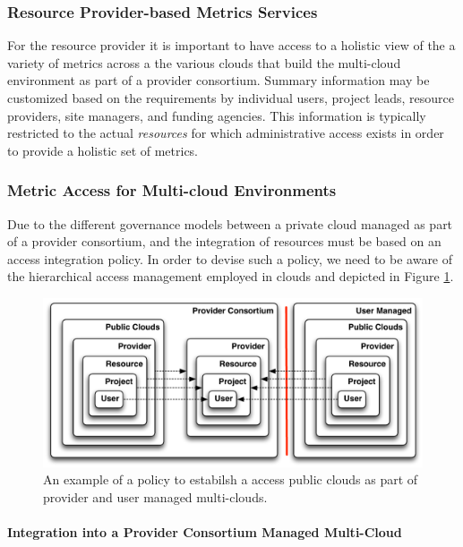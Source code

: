 \documentclass{tex/sig-alternate-2013}
\newcommand{\todo}[1]{{\color{red}{#1}}}
\begin{document}
{\subsubsection{Resource Provider-based Metrics Services} \label{S:resource-metric}

\todo{READ}

For the resource provider it is important to have access to a holistic view of the a variety of metrics across a the various clouds that build the multi-cloud environment as part of a provider consortium.  Summary information may be customized based on the requirements by individual users, project leads, resource providers, site managers, and funding agencies. This information is typically restricted to the actual {\em resources} for which administrative access exists in order to provide a holistic set of metrics.


\subsubsection{Metric Access for Multi-cloud Environments} 

\todo{READ}

Due to the different governance models between a private cloud managed as part of a provider consortium, and the integration of resources must be based on an access integration policy. In order to devise such a policy, we need to be aware of the hierarchical access management employed in clouds and depicted in Figure \ref{F:metric-hierarchy}.

\begin{figure}[htb]
  \centering
    \includegraphics[width=1.0\columnwidth]{images/metric-hierarchy.pdf}
  \caption{An example of a policy to estabilsh a access public clouds as part of 
    provider and user managed multi-clouds.}
  \label{F:metric-hierarchy}
\end{figure}

\paragraph{Integration into a Provider Consortium Managed Multi-Cloud}

}
\end{document}
